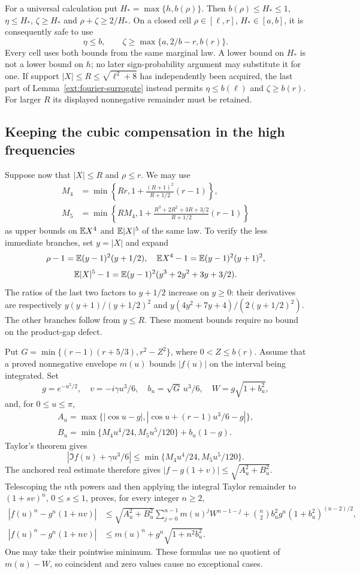 For a universal calculation put $H_* =\max\{h,b(\rho)\}$.
Then $b(\rho)\le H_*\le1$, $\eta\le H_*$, $\zeta\ge H_*$ and
$\rho+\zeta\ge2/H_*$. On a closed cell
$\rho\in[\ell,r]$, $H_*\in[a,b]$, it is consequently safe to use
\[
 \eta\le b,\qquad
 \zeta\ge\max\{a,2/b-r,b(r)\}.
\]
Every cell uses both bounds from the same marginal law. A lower bound on
$H_*$ is not a lower bound on $h$; no later sign-probability argument may
substitute it for one. If support $|X|\le R\le\sqrt{\ell^2+8}$ has independently been acquired,
the last part of Lemma~\ref{ext:fourier-surrogate} instead permits
$\eta\le b(\ell)$ and $\zeta\ge b(r)$. For larger $R$ its displayed
nonnegative remainder must be retained.

\subsection{Keeping the cubic compensation in the high frequencies}
\label{ext:compensated-high}
Suppose now that $|X|\le R$ and $\rho\le r$. We may use
\begin{align*}
 M_4&=\min\left\{Rr,1+\frac{(R+1)^2}{R+1/2}(r-1)\right\},\\
 M_5&=\min\left\{RM_4,
 1+\frac{R^3+2R^2+3R+3/2}{R+1/2}(r-1)\right\}
\end{align*}
as upper bounds on $\mathbb E X^4$ and $\mathbb E|X|^5$ of the same law. To verify the
less immediate branches, set $y=|X|$ and expand
\[
 \rho-1=\mathbb E(y-1)^2(y+1/2),\quad
 \mathbb E X^4-1=\mathbb E(y-1)^2(y+1)^2,
\]
\[
 \mathbb E|X|^5-1=\mathbb E(y-1)^2(y^3+2y^2+3y+3/2).
\]
The ratios of the last two factors to $y+1/2$ increase on $y\ge0$:
their derivatives are respectively
$y(y+1)/(y+1/2)^2$ and $y(4y^2+7y+4)/(2(y+1/2)^2)$.
The other branches follow from $y\le R$. These moment bounds require
no bound on the product-gap defect.

Put $G=\min\{(r-1)(r+5/3),r^2-Z^2\}$, where $0<Z\le b(r)$.
Assume that a proved nonnegative envelope $m(u)$ bounds $|f(u)|$ on
the interval being integrated. Set
\[
 g=e^{-u^2/2},\quad v=-i\gamma u^3/6,\quad
 b_u=\sqrt G\,u^3/6,\quad W=g\sqrt{1+b_u^2},
\]
and, for $0\le u\le\pi$,
\[
 \begin{gathered}
 A_u=\max\{|\cos u-g|,
 |\cos u+(r-1)u^3/6-g|\},\\
 B_u=\min\{M_4u^4/24, M_5u^5/120\}+b_u(1-g).
 \end{gathered}
\]
Taylor's theorem gives
\[
 |\Im f(u)+\gamma u^3/6|\le\min\{M_4u^4/24,M_5u^5/120\}.
\]
The anchored real estimate therefore gives
$|f-g(1+v)|\le\sqrt{A_u^2+B_u^2}$. Telescoping the $n$th powers and
then applying the integral Taylor remainder to $(1+sv)^n$, $0\le s\le1$,
proves, for every integer $n\ge2$,
\begin{align*}
 |f(u)^n-g^n(1+nv)|
 &\le\sqrt{A_u^2+B_u^2}\sum_{j=0}^{n-1}m(u)^jW^{n-1-j}
 +\binom n2 b_u^2g^n(1+b_u^2)^{(n-2)/2},\\
 |f(u)^n-g^n(1+nv)|
 &\le m(u)^n+g^n\sqrt{1+n^2b_u^2}.
\end{align*}
One may take their pointwise minimum. These formulas use no quotient of
$m(u)-W$, so coincident and zero values cause no exceptional cases.

